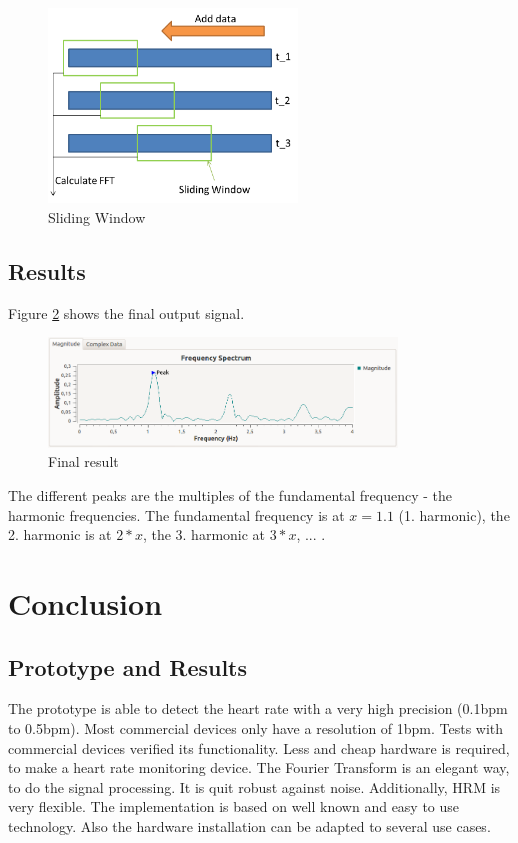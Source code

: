 \documentclass[notitlepage]{scrreprt}
\begin{document}
\begin{figure}[H]
	\centering
	\includegraphics[width=250px]{images/slidingWindow.png}
	\caption{Sliding Window}
	\label{fig:sliding-window}
\end{figure}

\section{Results}
Figure \ref{fig:result} shows the final output signal.

\begin{figure}[H]
	\centering
	\includegraphics[width=350px]{images/withEverything.png}
	\caption{Final result}
	\label{fig:result}
\end{figure}

The different peaks are the multiples of the fundamental frequency - the harmonic frequencies. The fundamental frequency is at $x = 1.1$ (1. harmonic), the 2. harmonic is at $2*x$, the 3. harmonic at $3*x$, ... . 

\chapter{Conclusion}
\section{Prototype and Results}
The prototype is able to detect the heart rate with a very high precision (0.1bpm to 0.5bpm). Most commercial devices only have a resolution of 1bpm. Tests with commercial devices verified its functionality. Less and cheap hardware is required, to make a heart rate monitoring device. The Fourier Transform is an elegant way, to do the signal processing. It is quit robust against noise. Additionally, HRM is very flexible. The implementation is based on well known and easy to use technology. Also the hardware installation can be adapted to several use cases.
\end{document}
